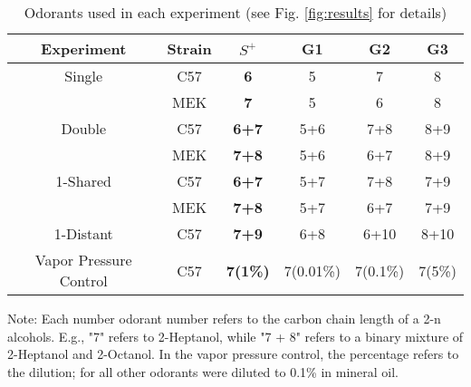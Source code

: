 \begin{table}
\label{tab:design}
    \begin{tabular}{ c | c | c | c | c | c }
        Experiment & Strain & \textbf{$S^+$} & G1 & G2 & G3 \\ 
        \hline
        Single & C57 & \textbf{6} & 5 & 7 & 8 \\ 
         & MEK & \textbf{7} & 5 & 6 & 8 \\ 
        \hline
        Double & C57 & \textbf{6+7} & 5+6 & 7+8 & 8+9 \\ 
         & MEK & \textbf{7+8} & 5+6 & 6+7 & 8+9 \\ 
        \hline
        1-Shared & C57 & \textbf{6+7} & 5+7 & 7+8 & 7+9 \\ 
         & MEK & \textbf{7+8} & 5+7 & 6+7 & 7+9 \\ 
        \hline
        1-Distant & C57 & \textbf{7+9} & 6+8 & 6+10 & 8+10 \\ 
        \hline
        Vapor Pressure Control & C57 & \textbf{7(1\%)} & 7(0.01\%) & 7(0.1\%) & 7(5\%) \\ 
    \end{tabular}
    \caption{Odorants used in each experiment (see Fig. \ref{fig:results} for details)}
\end{table}
Note: Each number odorant number refers to the carbon chain length of a 2-n alcohols. E.g., "7" refers to 2-Heptanol, while "7 + 8" refers to a binary mixture of 2-Heptanol and 2-Octanol. In the vapor pressure control, the percentage refers to the dilution; for all other odorants were diluted to {0.1\%} in mineral oil.